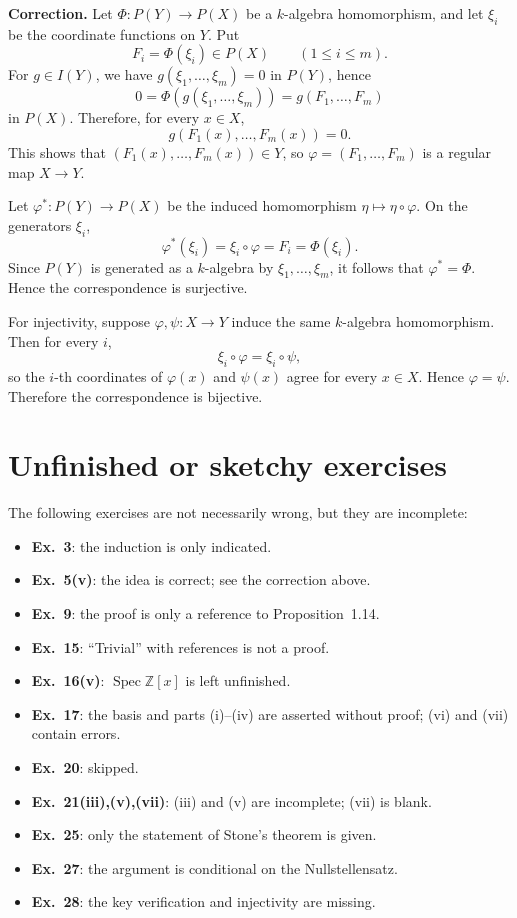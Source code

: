 \documentclass[11pt]{article}
\DeclareMathOperator{\Spec}{Spec}
\begin{document}
\textbf{Correction.}  Let \(\Phi:P(Y)\to P(X)\) be a \(k\)-algebra
homomorphism, and let \(\xi_i\) be the coordinate functions on \(Y\).  Put
\[
F_i=\Phi(\xi_i)\in P(X)\qquad(1\le i\le m).
\]
For \(g\in I(Y)\), we have \(g(\xi_1,\ldots,\xi_m)=0\) in \(P(Y)\), hence
\[
0=\Phi(g(\xi_1,\ldots,\xi_m))=g(F_1,\ldots,F_m)
\]
in \(P(X)\).  Therefore, for every \(x\in X\),
\[
g(F_1(x),\ldots,F_m(x))=0.
\]
This shows that \((F_1(x),\ldots,F_m(x))\in Y\), so
\(\varphi=(F_1,\ldots,F_m)\) is a regular map \(X\to Y\).

Let \(\varphi^*:P(Y)\to P(X)\) be the induced homomorphism
\(\eta\mapsto\eta\circ\varphi\).  On the generators \(\xi_i\),
\[
\varphi^*(\xi_i)=\xi_i\circ\varphi=F_i=\Phi(\xi_i).
\]
Since \(P(Y)\) is generated as a \(k\)-algebra by
\(\xi_1,\ldots,\xi_m\), it follows that \(\varphi^*=\Phi\).  Hence the
correspondence is surjective.

For injectivity, suppose \(\varphi,\psi:X\to Y\) induce the same
\(k\)-algebra homomorphism.  Then for every \(i\),
\[
\xi_i\circ\varphi=\xi_i\circ\psi,
\]
so the \(i\)-th coordinates of \(\varphi(x)\) and \(\psi(x)\) agree for every
\(x\in X\).  Hence \(\varphi=\psi\).  Therefore the correspondence is
bijective.

\section*{Unfinished or sketchy exercises}

The following exercises are not necessarily wrong, but they are incomplete:
\begin{itemize}[leftmargin=1.5em]
  \item \textbf{Ex.~3}: the induction is only indicated.
  \item \textbf{Ex.~5(v)}: the idea is correct; see the correction above.
  \item \textbf{Ex.~9}: the proof is only a reference to Proposition~1.14.
  \item \textbf{Ex.~15}: ``Trivial'' with references is not a proof.
  \item \textbf{Ex.~16(v)}: \(\Spec\mathbb Z[x]\) is left unfinished.
  \item \textbf{Ex.~17}: the basis and parts (i)--(iv) are asserted without
        proof; (vi) and (vii) contain errors.
  \item \textbf{Ex.~20}: skipped.
  \item \textbf{Ex.~21(iii),(v),(vii)}: (iii) and (v) are incomplete;
        (vii) is blank.
  \item \textbf{Ex.~25}: only the statement of Stone's theorem is given.
  \item \textbf{Ex.~27}: the argument is conditional on the
        Nullstellensatz.
  \item \textbf{Ex.~28}: the key verification and injectivity are missing.
\end{itemize}
\end{document}
